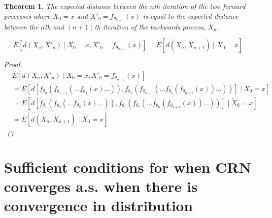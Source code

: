 \documentclass{article}
\theoremstyle{plain}%
\newtheorem{theorem}{Theorem}[section]
\theoremstyle{definition}
\newtheorem{definition}{Definition}[section]
\theoremstyle{remark}
\begin{document}
	
	\begin{theorem}
		The expected distance between the $n$th iteration of the two forward processes where $X_0=x$ and $X'_0=f_{\theta_{n+1}}(x)$ is equal to the expected distance between the $n$th and $(n+1)$th iteration of the backwards process, $\tilde{X}_n$. 
		
		$$E[d(X_n,X'_{n})\mid X_0=x, X'_{0}=f_{\theta_{n+1}}(x)]=E[d(\tilde{X}_n,\tilde{X}_{n+1})\mid \tilde{X}_0 = x]$$
		
		\begin{proof}
			\begin{align*}
				&E[d(X_n,X'_{n})\mid X_0=x, X'_{0}=f_{\theta_{n+1}}(x)] \\
				&=E[d[f_{\theta_n}(f_{\theta_{n-1}}(\ldots f_{\theta_1}(x)\ldots)),f_{\theta_n}(f_{\theta_{n-1}}(\ldots f_{\theta_1}(f_{\theta_{n+1}}(x))\ldots))]\mid X_0=x]\\
				&=E[d[f_{\theta_1}(f_{\theta_{2}}(\ldots f_{\theta_n}(x)\ldots)),f_{\theta_1}(f_{\theta_{2}}(\ldots f_{\theta_n}(f_{\theta_{n+1}}(x))\ldots))]\mid \tilde{X}_0=x]\\
				&= E[d(\tilde{X}_n,\tilde{X}_{n+1})\mid \tilde{X}_0 = x]
			\end{align*}
		\end{proof}
	\end{theorem}
	
	
	\section{Sufficient conditions for when CRN converges a.s. when there is convergence in distribution}
	
\end{document}
